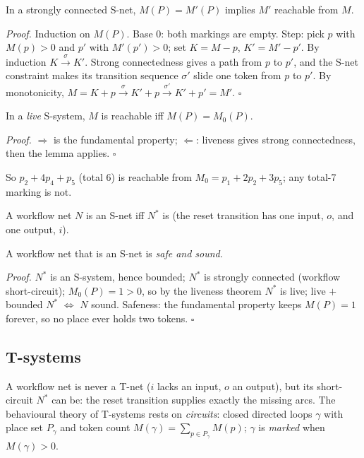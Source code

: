 \begin{lemma}
In a strongly connected S-net, $M(P) = M'(P)$ implies $M'$ reachable from $M$.
\end{lemma}
\textit{Proof.} Induction on $M(P)$. Base $0$: both markings are empty. Step: pick $p$ with $M(p) > 0$ and $p'$ with $M'(p') > 0$; set $K = M - p$, $K' = M' - p'$. By induction $K \xrightarrow{\sigma} K'$. Strong connectedness gives a path from $p$ to $p'$, and the S-net constraint makes its transition sequence $\sigma'$ slide one token from $p$ to $p'$. By monotonicity, $M = K + p \xrightarrow{\sigma} K' + p \xrightarrow{\sigma'} K' + p' = M'$. \hfill$\square$

\begin{theorem}
In a \emph{live} S-system, $M$ is reachable iff $M(P) = M_0(P)$.
\end{theorem}
\textit{Proof.} $\Rightarrow$ is the fundamental property; $\Leftarrow$: liveness gives strong connectedness, then the lemma applies. \hfill$\square$

So $p_2 + 4p_4 + p_5$ (total 6) is reachable from $M_0 = p_1 + 2p_2 + 3p_5$; any total-7 marking is not.

A workflow net $N$ is an S-net iff $N^*$ is (the reset transition has one input, $o$, and one output, $i$).

\begin{theorem}
A workflow net that is an S-net is \emph{safe and sound}.
\end{theorem}
\textit{Proof.} $N^*$ is an S-system, hence bounded; $N^*$ is strongly connected (workflow short-circuit); $M_0(P) = 1 > 0$, so by the liveness theorem $N^*$ is live; live $+$ bounded $N^*$ $\iff$ $N$ sound. Safeness: the fundamental property keeps $M(P) = 1$ forever, so no place ever holds two tokens. \hfill$\square$

\subsection{T-systems}

A workflow net is never a T-net ($i$ lacks an input, $o$ an output), but its short-circuit $N^*$ can be: the reset transition supplies exactly the missing arcs. The behavioural theory of T-systems rests on \emph{circuits}: closed directed loops $\gamma$ with place set $P_\gamma$ and token count $M(\gamma) = \sum_{p \in P_\gamma} M(p)$; $\gamma$ is \emph{marked} when $M(\gamma) > 0$.


